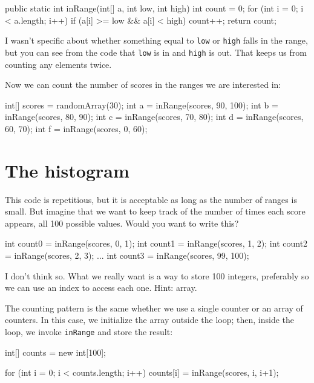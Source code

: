 \begin{code}
public static int inRange(int[] a, int low, int high) {
    int count = 0;
    for (int i = 0; i < a.length; i++) {
        if (a[i] >= low && a[i] < high) count++;
    }
    return count;
}
\end{code}

I wasn't specific about whether something equal
to {\tt low} or {\tt high} falls in the range, but you can
see from the code that {\tt low} is in and {\tt high} is out.
That keeps us from counting any elements twice.

Now we can count the number of scores in the ranges we are
interested in:

\begin{code}
int[] scores = randomArray(30);
int a = inRange(scores, 90, 100);
int b = inRange(scores, 80, 90);
int c = inRange(scores, 70, 80);
int d = inRange(scores, 60, 70);
int f = inRange(scores, 0, 60);
\end{code}


\section{The histogram}

This code is repetitious, but it is acceptable as
long as the number of ranges is small.  But imagine that
we want to keep track of the number of times each score appears,
all 100 possible values.  Would you want to write this?

\begin{code}
int count0 = inRange(scores, 0, 1);
int count1 = inRange(scores, 1, 2);
int count2 = inRange(scores, 2, 3);
...
int count3 = inRange(scores, 99, 100);
\end{code}

I don't think so.  What we really want is a way to store 100 integers,
preferably so we can use an index to access each one.  Hint: array.

The counting pattern is the same whether we use a single counter or an
array of counters.  In this case, we initialize the array outside the
loop; then, inside the loop, we invoke {\tt inRange} and store the
result:

\begin{code}
    int[] counts = new int[100];

    for (int i = 0; i < counts.length; i++) {
        counts[i] = inRange(scores, i, i+1);
    }
\end{code}

